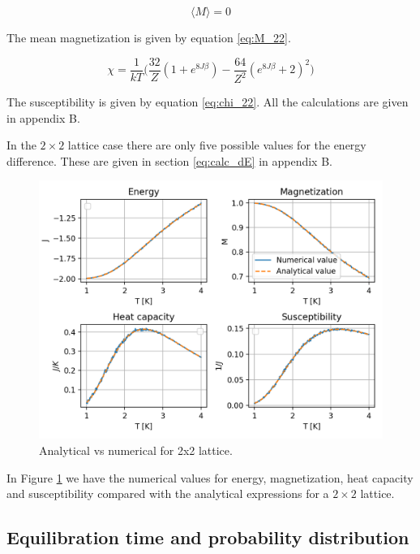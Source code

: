 \documentclass{article}
\begin{document}
\begin{multicols}{2}
\begin{equation}
\langle M \rangle=0
\label{eq:M_22}
\end{equation}

The mean magnetization is given by equation \ref{eq:M_22}.

\begin{equation}
\chi = \frac{1}{kT} \bigg(\frac{32}{Z}(1+e^{8J\beta})-\frac{64}{Z^2}(e^{8J\beta}+2)^2\bigg)
\label{eq:chi_22}
\end{equation}

The susceptibility is given by equation \ref{eq:chi_22}. All the calculations are given in appendix B.

In the $2\times2$ lattice case there are only five possible values for the energy difference. These are given in section \ref{eq:calc_dE} in appendix B. 

\begin{figure}[H]
	\centering
	\includegraphics[width=\linewidth]{Exp_values_2x2_5e5.png}
	\caption{Analytical vs numerical for 2x2 lattice. }
	\label{fig:exp_val}
\end{figure}

In Figure \ref{fig:exp_val} we have the numerical values for energy, magnetization, heat capacity and susceptibility compared with the analytical expressions for a $2\times2$ lattice. 

\subsection*{Equilibration time and probability distribution}


\end{multicols}
\end{document}
